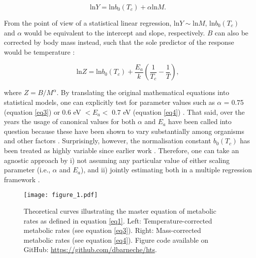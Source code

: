 \documentclass[a4paper,12pt]{article}
\begin{document}
\begin{equation}
  \textrm{ln}Y = \textrm{ln}b_0(T_c) + \alpha \textrm{ln}M.
  \label{eq3}
\end{equation}

From the point of view of a statistical linear regression, $\textrm{ln}Y \sim \textrm{ln}M$, $\textrm{ln}b_0(T_c)$ and $\alpha$ would be equivalent to the intercept and slope, respectively. $B$ can also be corrected by body mass instead, such that the sole predictor of the response would be temperature \citep[Figure \ref{fig1}, right;][]{brown2004ecology, savage2004amnat}:

\begin{equation}
  \textrm{ln}Z = \textrm{ln}b_0(T_c) + \frac{E_a}{k}\left(\frac{1}{T_c} - \frac{1}{T}\right),
  \label{eq4}
\end{equation}

where $Z = B / M^\alpha$. By translating the original mathematical equations into statistical models, one can explicitly test for parameter values such as $\alpha$ = 0.75 (equation \ref{eq3}) or 0.6 eV $< E_a <$ 0.7 eV (equation \ref{eq4}) \citep{west1997science, gillooly2001science, brown2004ecology}. That said, over the years the usage of canonical values for both $\alpha$ and $E_a$ have been called into question because these have been shown to vary substantially among organisms and other factors \citep{makarieva2005functecol, glazier2005biolrev, moses2008amnat, glazier2010biolrev, pawar2016amnat, barton2019limn, white2003pnas, white2005jeb, delong2010pnas}. Surprisingly, however, the normalisation constant $b_0(T_c)$ has been treated as highly variable since earlier work \citep{brown2004ecology}. Therefore, one can take an agnostic approach by i) not assuming any particular value of either scaling parameter (i.e., $\alpha$ and $E_a$), and ii) jointly estimating both in a multiple regression framework \citep[i.e., using equations \ref{eq1}--\ref{eqSS};][]{barneche2014ele}.

\bigskip
\bigskip

\begin{figure}[!ht]
  \begin{center}
    \texttt{[image: figure\_1.pdf]}
  \end{center}
  \caption{Theoretical curves illustrating the master equation of metabolic rates as defined in equation \ref{eq1}. Left: Temperature-corrected metabolic rates (see equation \ref{eq3}). Right: Mass-corrected metabolic rates (see equation \ref{eq4}). Figure code available on GitHub: \url{https://github.com/dbarneche/hts}.}
  \label{fig1}
\end{figure}
\end{document}
